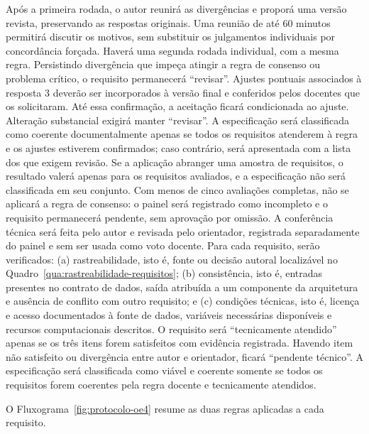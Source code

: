 Após a primeira rodada, o autor reunirá as divergências e proporá uma versão revista, preservando as respostas originais. Uma reunião de até 60 minutos permitirá discutir os motivos, sem substituir os julgamentos individuais por concordância forçada. Haverá uma segunda rodada individual, com a mesma regra. Persistindo divergência que impeça atingir a regra de consenso ou problema crítico, o requisito permanecerá ``revisar''. Ajustes pontuais associados à resposta 3 deverão ser incorporados à versão final e conferidos pelos docentes que os solicitaram. Até essa confirmação, a aceitação ficará condicionada ao ajuste. Alteração substancial exigirá manter ``revisar''. A especificação será classificada como coerente documentalmente apenas se todos os requisitos atenderem à regra e os ajustes estiverem confirmados; caso contrário, será apresentada com a lista dos que exigem revisão. Se a aplicação abranger uma amostra de requisitos, o resultado valerá apenas para os requisitos avaliados, e a especificação não será classificada em seu conjunto. Com menos de cinco avaliações completas, não se aplicará a regra de consenso: o painel será registrado como incompleto e o requisito permanecerá pendente, sem aprovação por omissão. A conferência técnica será feita pelo autor e revisada pelo orientador, registrada separadamente do painel e sem ser usada como voto docente. Para cada requisito, serão verificados: (a) rastreabilidade, isto é, fonte ou decisão autoral localizável no Quadro~\ref{qua:rastreabilidade-requisitos}; (b) consistência, isto é, entradas presentes no contrato de dados, saída atribuída a um componente da arquitetura e ausência de conflito com outro requisito; e (c) condições técnicas, isto é, licença e acesso documentados à fonte de dados, variáveis necessárias disponíveis e recursos computacionais descritos. O requisito será ``tecnicamente atendido'' apenas se os três itens forem satisfeitos com evidência registrada. Havendo item não satisfeito ou divergência entre autor e orientador, ficará ``pendente técnico''. A especificação será classificada como viável e coerente somente se todos os requisitos forem coerentes pela regra docente e tecnicamente atendidos.

O Fluxograma~\ref{fig:protocolo-oe4} resume as duas regras aplicadas a cada requisito.



